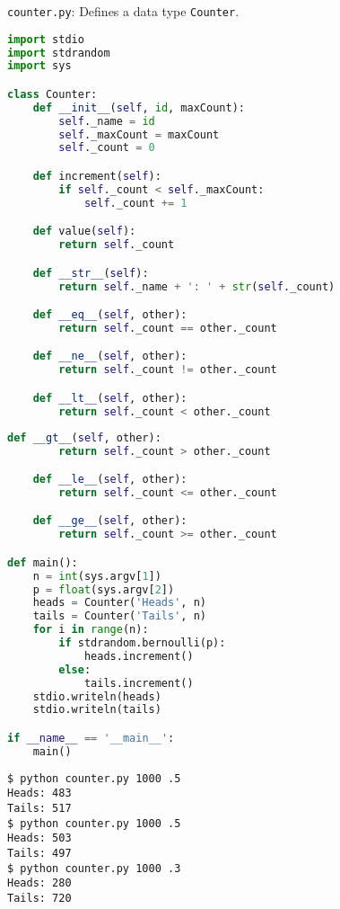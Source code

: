 \documentclass[8pt,a4paper,compress,handout]{beamer}
\begin{document}
\begin{frame}[fragile]
\begin{framed}
\tiny \lstinline{counter.py}: Defines a data type \lstinline{Counter}.
\end{framed}

\begin{lstlisting}[language=Python]
import stdio
import stdrandom
import sys

class Counter:
    def __init__(self, id, maxCount):
        self._name = id
        self._maxCount = maxCount
        self._count = 0

    def increment(self):
        if self._count < self._maxCount:
            self._count += 1

    def value(self):
        return self._count

    def __str__(self):
        return self._name + ': ' + str(self._count)

    def __eq__(self, other):
        return self._count == other._count

    def __ne__(self, other):
        return self._count != other._count

    def __lt__(self, other):
        return self._count < other._count
\end{lstlisting}
\end{frame}

\begin{frame}[fragile]
\begin{lstlisting}[language=Python]
    def __gt__(self, other):
        return self._count > other._count

    def __le__(self, other):
        return self._count <= other._count

    def __ge__(self, other):
        return self._count >= other._count

def main():
    n = int(sys.argv[1])
    p = float(sys.argv[2])
    heads = Counter('Heads', n)
    tails = Counter('Tails', n)
    for i in range(n):
        if stdrandom.bernoulli(p):
            heads.increment()
        else:
            tails.increment()
    stdio.writeln(heads)
    stdio.writeln(tails)

if __name__ == '__main__':
    main()
\end{lstlisting}

\begin{lstlisting}[language={}]
$ python counter.py 1000 .5
Heads: 483
Tails: 517
$ python counter.py 1000 .5
Heads: 503
Tails: 497
$ python counter.py 1000 .3
Heads: 280
Tails: 720
\end{lstlisting}
\end{frame}
\end{document}
